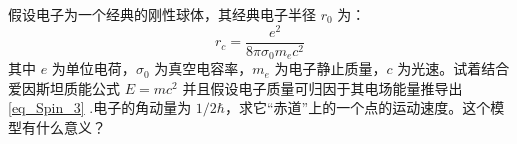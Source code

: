 
\begin{exercise}{}
假设电子为一个经典的刚性球体，其经典电子半径 $r_0$ 为：
\begin{equation}\label{eq_Spin_3}
r_c=\frac{e^2}{8\pi\sigma_0m_e c^2}
\end{equation}
其中 $e$ 为单位电荷，$\sigma_0$ 为真空电容率，$m_e$ 为电子静止质量，$c$ 为光速。试着结合爱因斯坦质能公式 $E=mc^2$ 并且假设电子质量可归因于其电场能量推导出\autoref{eq_Spin_3} .电子的角动量为 $1/2\hbar$，求它“赤道”上的一个点的运动速度。这个模型有什么意义？
\end{exercise}
